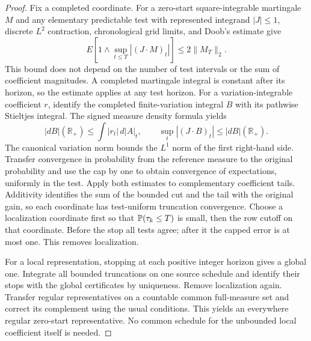 \begin{proof}
Fix a completed coordinate. For a zero-start square-integrable martingale $M$
and any elementary predictable test with represented integrand $|J|\leq1$,
discrete $L^2$ contraction, chronological grid limits, and Doob's estimate give
\[
 E\left[1\wedge\sup_{t\leq T}|(J\cdot M)_t|\right]\leq2\|M_T\|_2.
\]
This bound does not depend on the number of test intervals or the sum of
coefficient magnitudes. A completed martingale integral is constant after its
horizon, so the estimate applies at any test horizon.
For a variation-integrable coefficient $r$, identify the completed
finite-variation integral $B$ with its pathwise Stieltjes integral. The signed
measure density formula yields
\[
 |dB|(\mathbb R_+)\leq\int|r_t|\,d|A|_t,\qquad
 \sup_t|(J\cdot B)_t|\leq|dB|(\mathbb R_+).
\]
The canonical variation norm bounds the $L^1$ norm of the first right-hand
side. Transfer convergence in probability from the reference measure to the
original probability and use the cap by one to obtain convergence of
expectations, uniformly in the test.
Apply both estimates to complementary coefficient tails. Additivity
identifies the sum of the bounded cut and the tail with the original gain,
so each coordinate has test-uniform truncation convergence.
Choose a localization coordinate first so that $\mathbb P(\tau_k\leq T)$ is small,
then the row cutoff on that coordinate. Before the stop all tests agree;
after it the capped error is at most one. This removes localization.

For a local representation, stopping at each positive integer horizon gives
a global one. Integrate all bounded truncations on one source schedule and
identify their stops with the global certificates by uniqueness. Remove
localization again. Transfer regular representatives on a countable common
full-measure set and correct its complement using the usual conditions.
This yields an everywhere regular zero-start representative. No common
schedule for the unbounded local coefficient itself is needed.
\end{proof}

